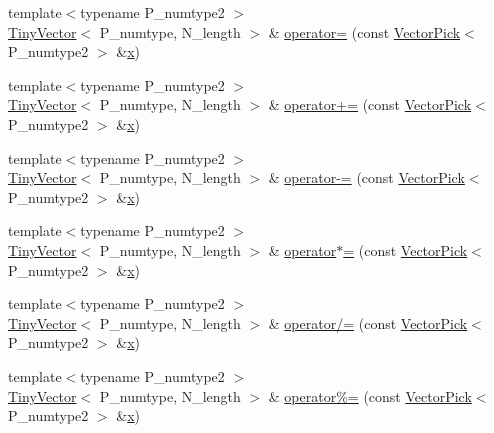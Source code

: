 \begin{DoxyCompactItemize}
{\footnotesize template$<$typename P\+\_\+numtype2 $>$ }\\\hyperlink{classTinyVector}{Tiny\+Vector}$<$ P\+\_\+numtype, N\+\_\+length $>$ \& \hyperlink{classTinyVector_a37911d5c8eafdce1b66e8a84c72462bf}{operator=} (const \hyperlink{classVectorPick}{Vector\+Pick}$<$ P\+\_\+numtype2 $>$ \&\hyperlink{vecnorm1_8cc_ac73eed9e41ec09d58f112f06c2d6cb63}{x})
\item 
{\footnotesize template$<$typename P\+\_\+numtype2 $>$ }\\\hyperlink{classTinyVector}{Tiny\+Vector}$<$ P\+\_\+numtype, N\+\_\+length $>$ \& \hyperlink{classTinyVector_a1f757108a326fb952169f161649835a7}{operator+=} (const \hyperlink{classVectorPick}{Vector\+Pick}$<$ P\+\_\+numtype2 $>$ \&\hyperlink{vecnorm1_8cc_ac73eed9e41ec09d58f112f06c2d6cb63}{x})
\item 
{\footnotesize template$<$typename P\+\_\+numtype2 $>$ }\\\hyperlink{classTinyVector}{Tiny\+Vector}$<$ P\+\_\+numtype, N\+\_\+length $>$ \& \hyperlink{classTinyVector_a085c02f8c544e8821730e24228d31985}{operator-\/=} (const \hyperlink{classVectorPick}{Vector\+Pick}$<$ P\+\_\+numtype2 $>$ \&\hyperlink{vecnorm1_8cc_ac73eed9e41ec09d58f112f06c2d6cb63}{x})
\item 
{\footnotesize template$<$typename P\+\_\+numtype2 $>$ }\\\hyperlink{classTinyVector}{Tiny\+Vector}$<$ P\+\_\+numtype, N\+\_\+length $>$ \& \hyperlink{classTinyVector_ab19405cc015a166bcc5a753911220e4b}{operator$\ast$=} (const \hyperlink{classVectorPick}{Vector\+Pick}$<$ P\+\_\+numtype2 $>$ \&\hyperlink{vecnorm1_8cc_ac73eed9e41ec09d58f112f06c2d6cb63}{x})
\item 
{\footnotesize template$<$typename P\+\_\+numtype2 $>$ }\\\hyperlink{classTinyVector}{Tiny\+Vector}$<$ P\+\_\+numtype, N\+\_\+length $>$ \& \hyperlink{classTinyVector_a5efe94daa9fed4687654d24ff163d77e}{operator/=} (const \hyperlink{classVectorPick}{Vector\+Pick}$<$ P\+\_\+numtype2 $>$ \&\hyperlink{vecnorm1_8cc_ac73eed9e41ec09d58f112f06c2d6cb63}{x})
\item 
{\footnotesize template$<$typename P\+\_\+numtype2 $>$ }\\\hyperlink{classTinyVector}{Tiny\+Vector}$<$ P\+\_\+numtype, N\+\_\+length $>$ \& \hyperlink{classTinyVector_a76d5f502b2980ac08b239efaec63a9d9}{operator\%=} (const \hyperlink{classVectorPick}{Vector\+Pick}$<$ P\+\_\+numtype2 $>$ \&\hyperlink{vecnorm1_8cc_ac73eed9e41ec09d58f112f06c2d6cb63}{x})
\item 

\end{DoxyCompactItemize}
